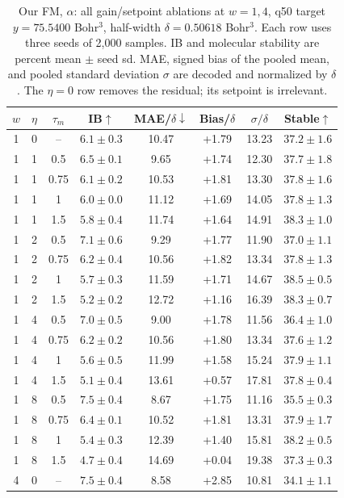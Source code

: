 \documentclass{article}
\begin{document}
\begin{table}[!htbp]
\centering\small
\caption{Our FM, $\alpha$: all gain/setpoint ablations at $w=1,4$, q50 target $y=75.5400$ Bohr$^3$, half-width $\delta=0.50618$ Bohr$^3$. Each row uses three seeds of 2,000 samples. IB and molecular stability are percent mean $\pm$ seed sd. MAE, signed bias of the pooled mean, and pooled standard deviation $\sigma$ are decoded and normalized by $\delta$. The $\eta=0$ row removes the residual; its setpoint is irrelevant.}
\label{tab:grid-fm-alpha}
\begin{tabular}{cccccccc}
\toprule
$w$ & $\eta$ & $\tau_m$ & IB$\uparrow$ & MAE/$\delta\downarrow$ & Bias/$\delta$ & $\sigma/\delta$ & Stable$\uparrow$\\
\midrule
1 & 0 & -- & $6.1\pm0.3$ & 10.47 & +1.79 & 13.23 & $37.2\pm1.6$\\
1 & 1 & 0.5 & $6.5\pm0.1$ & 9.65 & +1.74 & 12.30 & $37.7\pm1.8$\\
1 & 1 & 0.75 & $6.1\pm0.2$ & 10.53 & +1.81 & 13.30 & $37.8\pm1.6$\\
1 & 1 & 1 & $6.0\pm0.0$ & 11.12 & +1.69 & 14.05 & $37.8\pm1.3$\\
1 & 1 & 1.5 & $5.8\pm0.4$ & 11.74 & +1.64 & 14.91 & $38.3\pm1.0$\\
1 & 2 & 0.5 & $7.1\pm0.6$ & 9.29 & +1.77 & 11.90 & $37.0\pm1.1$\\
1 & 2 & 0.75 & $6.2\pm0.4$ & 10.56 & +1.82 & 13.34 & $37.8\pm1.3$\\
1 & 2 & 1 & $5.7\pm0.3$ & 11.59 & +1.71 & 14.67 & $38.5\pm0.5$\\
1 & 2 & 1.5 & $5.2\pm0.2$ & 12.72 & +1.16 & 16.39 & $38.3\pm0.7$\\
1 & 4 & 0.5 & $7.0\pm0.5$ & 9.00 & +1.78 & 11.56 & $36.4\pm1.0$\\
1 & 4 & 0.75 & $6.2\pm0.2$ & 10.56 & +1.80 & 13.34 & $37.6\pm1.2$\\
1 & 4 & 1 & $5.6\pm0.5$ & 11.99 & +1.58 & 15.24 & $37.9\pm1.1$\\
1 & 4 & 1.5 & $5.1\pm0.4$ & 13.61 & +0.57 & 17.81 & $37.8\pm0.4$\\
1 & 8 & 0.5 & $7.5\pm0.4$ & 8.67 & +1.75 & 11.16 & $35.5\pm0.3$\\
1 & 8 & 0.75 & $6.4\pm0.1$ & 10.52 & +1.81 & 13.31 & $37.9\pm1.7$\\
1 & 8 & 1 & $5.4\pm0.3$ & 12.39 & +1.40 & 15.81 & $38.2\pm0.5$\\
1 & 8 & 1.5 & $4.7\pm0.4$ & 14.69 & +0.04 & 19.38 & $37.3\pm0.3$\\
\midrule
4 & 0 & -- & $7.5\pm0.4$ & 8.58 & +2.85 & 10.81 & $34.1\pm1.1$\\

\end{tabular}
\end{table}
\end{document}

